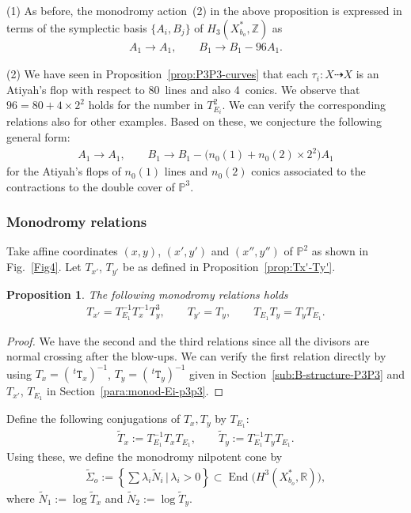 \documentclass[10pt,a4paper]{amsart}
\numberwithin{equation}{section}
\newtheorem{Proposition}[Theorem]{Proposition}
\begin{document}
\begin{Remark} \label{rem:Remark-TE1-II}(1) As before, the monodromy action~(2) in the above proposition is expressed in terms of the symplectic basis $\{ A_{i},B_{j}\} $ of $H_{3}(X_{b_{o}}^{*},\mathbb{Z})$ as
\begin{gather*}
A_{1}\to A_{1},\qquad B_{1}\to B_{1}-96 A_{1}.
\end{gather*}

(2) We have seen in Proposition~\ref{prop:P3P3-curves} that each $\tau_{i}\colon X\dashrightarrow X$ is an Atiyah's flop with respect to 80~lines and also 4~conics. We observe that $96=80+4\times2^{2}$ holds for the number in $T_{E_{i}}^{2}$. We can verify the corresponding relations also for other examples. Based on these, we conjecture the following general form:
\begin{gather*}
A_{1}\to A_{1},\qquad B_{1}\to B_{1}-\big(n_{0}(1)+n_{0}(2)\times2^{2}\big) A_{1}
\end{gather*}
for the Atiyah's flops of $n_{0}(1)$ lines and $n_{0}(2)$ conics associated to the contractions to the double cover of $\mathbb{P}^{3}$.
\end{Remark}

\subsubsection{Monodromy relations}
Take affine coordinates $(x,y)$, $(x',y')$ and $(x'',y'')$ of $\mathbb{P}^{2}$ as shown in Fig.~\ref{Fig4}. Let $T_{x'}$, $T_{y'}$ be as defined in Proposition~\ref{prop:Tx'-Ty'}.
\begin{Proposition} \label{prop:Monod-rel-P3P3}The following monodromy relations holds
\begin{gather}
\boxed{T_{x'}=T_{E_{1}}^{-1}T_{x}^{-1}T_{y}^{3},\qquad T_{y'}=T_{y},\qquad T_{E_{1}}T_{y}=T_{y}T_{E_{1}}.}\label{eq:XP3P3-monod-rel-1}
\end{gather}
\end{Proposition}
\begin{proof} We have the second and the third relations since all the divisors are normal crossing after the blow-ups. We can verify the first relation directly by using $T_{x}=(\,^{t}\mathtt{T}_{x})^{-1}$, $T_{y}=(\,^{t}\mathtt{T}_{y})^{-1}$ given in Section~\ref{sub:B-structure-P3P3} and $T_{x'}$, $T_{E_{1}}$ in Section~\ref{para:monod-Ei-p3p3}.
\end{proof}

\begin{Definition}
Define the following conjugations of $T_{x},T_{y}$ by $T_{E_{1}}$:
\begin{gather*}
\tilde{T}_{x}:=T_{E_{1}}^{-1}T_{x}T_{E_{1}},\qquad \tilde{T}_{y}:=T_{E_{1}}^{-1}T_{y}T_{E_{1}}.
\end{gather*}
Using these, we define the monodromy nilpotent cone by
\begin{gather*}
\tilde{\Sigma}_{o}:=\left\{ \sum\lambda_{i}\tilde{N}_{i}\,|\,\lambda_{i}>0\right\} \subset\operatorname{End}\big(H^{3}(X_{b_{o}}^{*},\mathbb{R})\big),
\end{gather*}
where $\tilde{N}_{1}:=\log\tilde{T}_{x}$ and $\tilde{N}_{2}:=\log\tilde{T}_{y}$.
\end{Definition}
\end{document}
